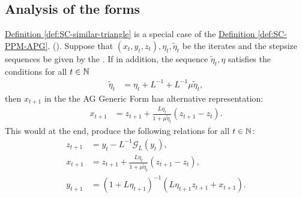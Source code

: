 \documentclass[12pt]{article}
\begin{document}
    \subsection{Analysis of the forms}
        \begin{proposition}
            \label{prop:s-cvx-generic-sim-triangle-from-s-cvx-ppm-apg}
            \hyperref[def:SC-similar-triangle]
            {Definition \ref*{def:SC-similar-triangle}}
            is a special case of the 
            \hyperref[def:SC-PPM-APG]{Definition \ref*{def:SC-PPM-APG}}. 
            (\SCPPMAPG). 
            Suppose that $(x_t, y_t, z_t), \eta_t, \tilde \eta_t$ be the iterates and the stepsize sequences be given by the 
            \SCPPMAPG.
            If in addition, the sequence $\tilde \eta_t, \eta$ satisfies the conditions for all $t \in \mathbb N$
            \begin{align*}
                \tilde\eta_{t} &= \eta_t + L^{-1} + L^{-1} \mu \tilde\eta_{t}, 
            \end{align*}
            then $x_{t +1}$ in the the AG Generic Form has alternative representation: 
            \begin{align*}
                x_{t + 1} &= 
                z_{t + 1} + 
                \frac{L\eta_t}{1 + \mu \tilde \eta_{t}} 
                (z_{t + 1} - z_t). 
            \end{align*}
            This would at the end, produce the following relations for all $t \in \mathbb N$: 
            \begin{align*}
                z_{t + 1} &= 
                y_t - L^{-1}\mathcal G_L(y_t), 
                \\
                x_{t + 1}&= 
                z_{t + 1} + \frac{L\eta_t}{1 + \mu\tilde \eta_{t}}(z_{t + 1} - z_t), 
                \\
                y_{t + 1}&= 
                (1 + L\eta_{t + 1})^{-1} (L\eta_{t + 1}z_{t + 1} + x_{t + 1}). 
            \end{align*}
        \end{proposition}
\end{document}
